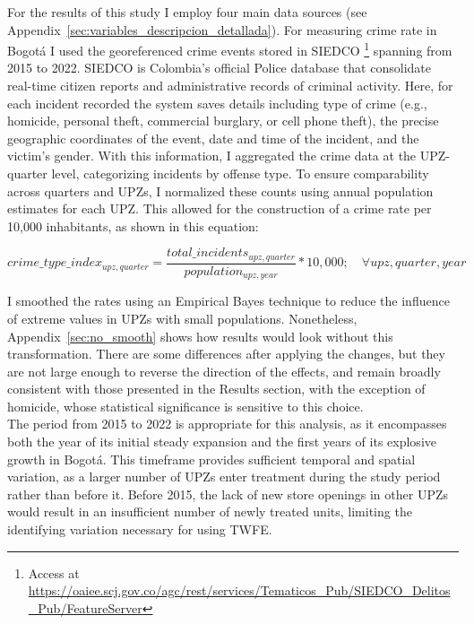 \documentclass[12pt]{article}
\begin{document}
For the results of this study I employ four main data sources (see Appendix~\ref{sec:variables_descripcion_detallada}). For measuring crime rate in Bogotá I used the georeferenced crime events stored in SIEDCO \footnote{Access at \url{ https://oaiee.scj.gov.co/agc/rest/services/Tematicos_Pub/SIEDCO_Delitos_Pub/FeatureServer}} spanning from 2015 to 2022. SIEDCO is Colombia’s official Police database that consolidate real-time citizen reports and administrative records of criminal activity. Here, for each incident recorded the system saves details including type of crime (e.g., homicide, personal theft, commercial burglary, or cell phone theft), the precise geographic coordinates of the event, date and time of the incident, and the victim’s gender. With this information, I aggregated the crime data at the UPZ-quarter level, categorizing incidents by offense type. To ensure comparability across quarters and UPZs, I normalized these counts using annual population estimates for each UPZ. This allowed for the construction of a crime rate per 10,000 inhabitants, as shown in this equation:

\begin{equation}
\label{eq:index_crime}
crime\_type\_index_{upz,quarter}=\frac{total\_incidents_{upz,quarter}}{population_{upz,year}} * 10,000; \quad \forall upz,quarter,year
\end{equation}

I smoothed the rates using an Empirical Bayes technique to reduce the influence of extreme values in UPZs with small populations. Nonetheless, Appendix~\ref{sec:no_smooth} shows how results would look without this transformation. There are some differences after applying the changes, but they are not large enough to reverse the direction of the effects, and remain broadly consistent with those presented in the Results section, with the exception of homicide, whose statistical significance is sensitive to this choice.\\

The period from 2015 to 2022 is appropriate for this analysis, as it encompasses both the year of its initial steady expansion and the first years of its explosive growth in Bogotá. This timeframe provides sufficient temporal and spatial variation, as a larger number of UPZs enter treatment during the study period rather than before it. Before 2015, the lack of new store openings in other UPZs would result in an insufficient number of newly treated units, limiting the identifying variation necessary for using TWFE.\\
\end{document}
